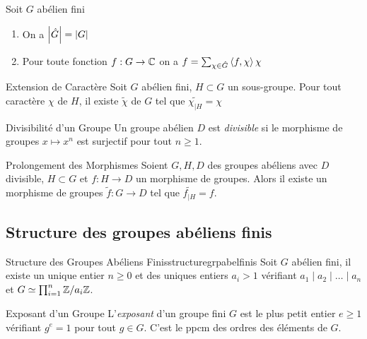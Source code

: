 \documentclass{cours}
\begin{document}
\begin{corollaire}{}{}
    Soit $G$ abélien fini
    \begin{enumerate}
        \item On a $\left|\hat{G}\right| = \left|G\right|$
        \item Pour toute fonction $f : G \rightarrow \mathbb{C}$ on a $f = \sum_{\chi \in \hat{G}} \left\langle f, \chi \right\rangle \chi$
    \end{enumerate}
\end{corollaire}

\begin{propositionfr}{Extension de Caractère}{}
    Soit $G$ abélien fini, $H \subset G$ un sous-groupe. Pour tout caractère $\chi$ de $H$, il existe $\tilde{\chi}$ de $G$ tel que $\tilde{\chi_{\mid H}} = \chi$
\end{propositionfr}

\begin{définition}{Divisibilité d'un Groupe}{}
    Un groupe abélien $D$ est \emph{divisible} si le morphisme de groupes $x \mapsto x^{n}$ est surjectif pour tout $n \geq 1$.
\end{définition}

\begin{propositionfr}{Prolongement des Morphismes}{}
    Soient $G, H, D$ des groupes abéliens avec $D$ divisible, $H \subset G$ et $f : H \rightarrow D$ un morphisme de groupes. Alors il existe un morphisme de groupes $\tilde{f} : G \rightarrow D$ tel que $\tilde{f_{\mid H}} = f$.
\end{propositionfr}

\subsection{Structure des groupes abéliens finis}
\begin{théorème}{Structure des Groupes Abéliens Finis}{structuregrpabelfinis}
    Soit $G$ abélien fini, il existe un unique entier $n\geq 0$ et des uniques entiers $a_{i} > 1$ vérifiant $a_{1} \mid a_{2} \mid \ldots \mid a_{n}$ et $G \simeq \prod_{i=1}^{n} \mathbb{Z}/a_{i}\mathbb{Z}$.
\end{théorème}

\begin{définition}{Exposant d'un Groupe}{}
    L'\emph{exposant} d'un groupe fini $G$ est le plus petit entier $e \geq 1$ vérifiant $g^{e} = 1$ pour tout $g \in G$. C'est le ppcm des ordres des éléments de $G$.
\end{définition}
\end{document}

